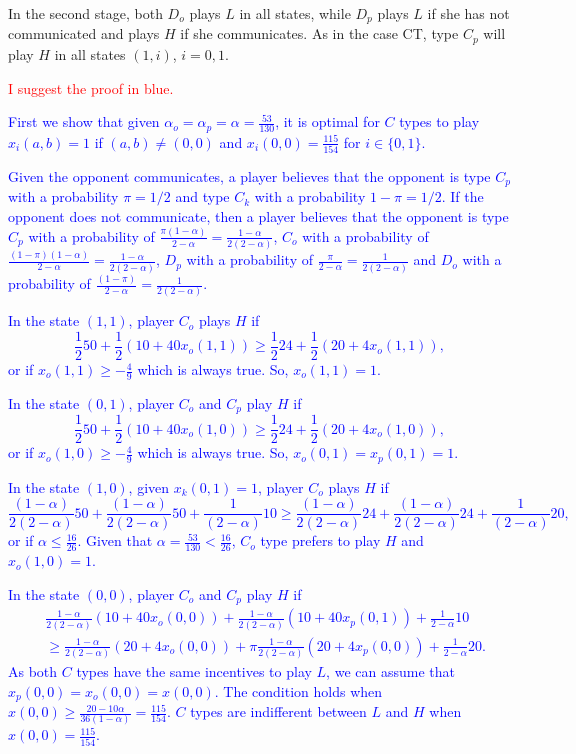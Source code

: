\documentclass[12pt]{article}
\theoremstyle{break}
\begin{document}
In the second stage, both $D_o$ plays $L$ in all states, while $D_p$ plays $L$ if she has not communicated and plays $H$ if she communicates. As in the case CT, type $C_p$ will play $H$ in all states $(1,i)$, $i=0,1$. 

\textcolor{red}{I suggest the proof in blue.}

\textcolor{blue}{First we show that given $\alpha_o=\alpha_p=\alpha=\frac{53}{130}$, it is optimal for $C$ types to play $x_i(a,b)=1$ if $(a,b)\neq (0,0)$ and $x_i(0,0)=\frac{115}{154}$ for $i\in\{0,1\}$.}

\textcolor{blue}{Given the opponent communicates, a player believes that the opponent is type $C_p$ with a probability $\pi=1/2$ and type $C_k$ with a probability $1-\pi=1/2$. If the opponent does not communicate, then a player believes that the opponent is type $C_p$ with a probability of $\frac{\pi (1-\alpha)}{2-\alpha}=\frac{1-\alpha}{2(2-\alpha)}$, $C_o$ with a probability of $\frac{(1-\pi) (1-\alpha)}{2-\alpha}=\frac{1-\alpha}{2(2-\alpha)}$, $D_p$ with a probability of $\frac{\pi }{2-\alpha}=\frac{1}{2(2-\alpha)}$ and $D_o$ with a probability of $\frac{(1-\pi) }{2-\alpha}=\frac{1}{2(2-\alpha)}$.}

\textcolor{blue}{In the state $(1,1)$, player $C_o$ plays $H$ if $$ \frac{1}{2} 50 + \frac{1}{2} (10+40x_o(1,1))\geq \frac{1}{2} 24 + \frac{1}{2} (20+4x_o(1,1)), $$ or if $x_o(1,1)\geq -\frac{4}{9}$ which is always true. So, $x_o(1,1)=1$.}

\textcolor{blue}{In the state $(0,1)$, player $C_o$ and $C_p$ play $H$ if $$ \frac{1}{2} 50 + \frac{1}{2} (10+40x_o(1,0))\geq \frac{1}{2} 24 + \frac{1}{2} (20+4x_o(1,0)), $$ or if $x_o(1,0)\geq -\frac{4}{9}$ which is always true. So, $x_o(0,1)=x_p(0,1)=1$.}

\textcolor{blue}{In the state $(1,0)$, given $x_k(0,1)=1$, player $C_o$ plays $H$ if $$ \frac{(1-\alpha)}{2(2-\alpha)} 50 + \frac{(1-\alpha)}{2(2-\alpha)} 50 + \frac{1}{(2-\alpha)} 10 \geq \frac{(1-\alpha)}{2(2-\alpha)} 24 + \frac{(1-\alpha)}{2(2-\alpha)} 24 + \frac{1}{(2-\alpha)} 20, $$ or if $\alpha \leq \frac{16}{26}$. Given that $\alpha=\frac{53}{130}<\frac{16}{26}$, $C_o$ type prefers to play $H$ and $x_o(1,0)=1$.}

\textcolor{blue}{In the state $(0,0)$, player $C_o$ and $C_p$ play $H$ if
\begin{align*}
	&\frac{1-\alpha}{2(2-\alpha)} (10+40x_o(0,0))+ \frac{1-\alpha}{2(2-\alpha)}(10+40 x_p(0,1))+\frac{1}{2-\alpha}10\\
		&\geq \frac{1-\alpha}{2(2-\alpha)} (20+4x_o(0,0))+\pi \frac{1-\alpha}{2(2-\alpha)}(20+4 x_p(0,0)) +\frac{1}{2-\alpha}20.
\end{align*}
As both $C$ types have the same incentives to play $L$, we can assume that $x_p(0,0)=x_o(0,0)=x(0,0)$. The condition holds when $x(0,0)\geq \frac{20-10\alpha}{36(1-\alpha)}=\frac{115}{154}$. $C$ types are indifferent between $L$ and $H$ when $x(0,0)=\frac{115}{154}$.}
\end{document}
